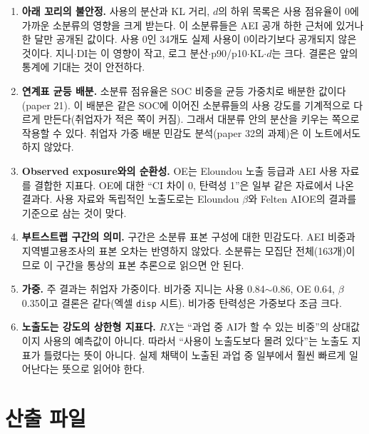 \documentclass[11pt]{article}
\begin{document}
\begin{enumerate}[leftmargin=*]
  \item \textbf{아래 꼬리의 불안정.} 사용의 분산과 KL 거리, $d$의 하위 목록은 사용 점유율이 0에 가까운 소분류의 영향을 크게 받는다. 이 소분류들은 AEI 공개 하한 근처에 있거나 한 달만 공개된 값이다. 사용 0인 34개도 실제 사용이 0이라기보다 공개되지 않은 것이다. 지니$\cdot$DI는 이 영향이 작고, 로그 분산$\cdot$p90/p10$\cdot$KL$\cdot$$d$는 크다. 결론은 앞의 통계에 기대는 것이 안전하다.
  \item \textbf{연계표 균등 배분.} 소분류 점유율은 SOC 비중을 균등 가중치로 배분한 값이다(paper 21). 이 배분은 같은 SOC에 이어진 소분류들의 사용 강도를 기계적으로 다르게 만든다(취업자가 적은 쪽이 커짐). 그래서 대분류 안의 분산을 키우는 쪽으로 작용할 수 있다. 취업자 가중 배분 민감도 분석(paper 32의 과제)은 이 노트에서도 하지 않았다.
  \item \textbf{Observed exposure와의 순환성.} OE는 Eloundou 노출 등급과 AEI 사용 자료를 결합한 지표다\parencite{massenkoff-2026-labor-market-impacts-of-ai}. OE에 대한 ``CI 차이 0, 탄력성 1''은 일부 같은 자료에서 나온 결과다. 사용 자료와 독립적인 노출도로는 Eloundou $\beta$\parencite{eloundou-2023-gpts-are-gpts-an-early}와 Felten AIOE\parencite{felten-2021-occupational-industry-and-geographic-exposure,felten-2023-how-will-language-modelers-like-chatgpt}의 결과를 기준으로 삼는 것이 맞다.
  \item \textbf{부트스트랩 구간의 의미.} 구간은 소분류 표본 구성에 대한 민감도다. AEI 비중과 지역별고용조사의 표본 오차는 반영하지 않았다. 소분류는 모집단 전체(163개)이므로 이 구간을 통상의 표본 추론으로 읽으면 안 된다.
  \item \textbf{가중.} 주 결과는 취업자 가중이다. 비가중 지니는 사용 0.84$\sim$0.86, OE 0.64, $\beta$ 0.35이고 결론은 같다(엑셀 \texttt{disp} 시트). 비가중 탄력성은 가중보다 조금 크다.
  \item \textbf{노출도는 강도의 상한형 지표다.} $RX$는 ``과업 중 AI가 할 수 있는 비중''의 상대값이지 사용의 예측값이 아니다. 따라서 ``사용이 노출도보다 몰려 있다''는 노출도 지표가 틀렸다는 뜻이 아니다. 실제 채택이 노출된 과업 중 일부에서 훨씬 빠르게 일어난다는 뜻으로 읽어야 한다.
\end{enumerate}

\section{산출 파일}
\end{document}
